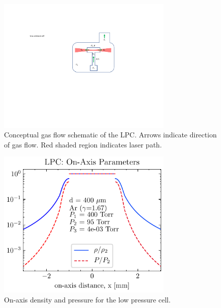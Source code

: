 \begin{figure}
	\centering
	\includegraphics[width=0.75\textwidth]{figures/chap3/LPC_schematic.pdf}
	\caption{Conceptual gas flow schematic of the LPC. Arrows indicate direction of gas flow. Red shaded region indicates laser path.}
	\label{fig:LPC_schematic}
\end{figure}


\begin{figure}
	\centering
	\includegraphics[width=0.75\textwidth]{figures/chap3/LPC_on_axis.pdf}
	\caption{On-axis density and pressure for the low pressure cell.}
	\label{fig:LPC_on_axis}
\end{figure}

